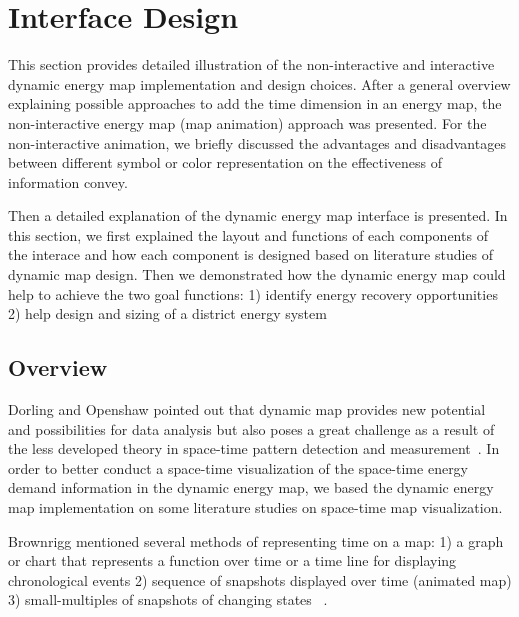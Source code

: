 
\chapter{Interface Design} %

\label{Chapter6} %


This section provides detailed illustration of the non-interactive and
interactive dynamic energy map implementation and design
choices. After a general overview explaining possible approaches to
add the time dimension in an energy map, the non-interactive energy
map (map animation) approach was presented. For the non-interactive
animation, we briefly discussed the advantages and disadvantages
between different symbol or color representation on the effectiveness
of information convey.

Then a detailed explanation of the dynamic energy map interface is
presented. In this section, we first explained the layout and
functions of each components of the interace and how each component is
designed based on literature studies of dynamic map design. Then we
demonstrated how the dynamic energy map could help to achieve the two
goal functions: 1) identify energy recovery opportunities 2) help
design and sizing of a district energy system

\section{Overview}

Dorling and Openshaw pointed out that dynamic map provides new
potential and possibilities for data analysis but also poses a great
challenge as a result of the less developed theory in space-time
pattern detection and measurement~\cite{Dorling1992}. In order to
better conduct a space-time visualization of the space-time energy
demand information in the dynamic energy map, we based the dynamic
energy map implementation on some literature studies on space-time map
visualization.

Brownrigg mentioned several methods of representing time on a map: 1)
a graph or chart that represents a function over time or a time line
for displaying chronological events 2) sequence of snapshots displayed
over time (animated map) 3) small-multiples of snapshots of changing
states ~\cite{Brownrigg2005}.

